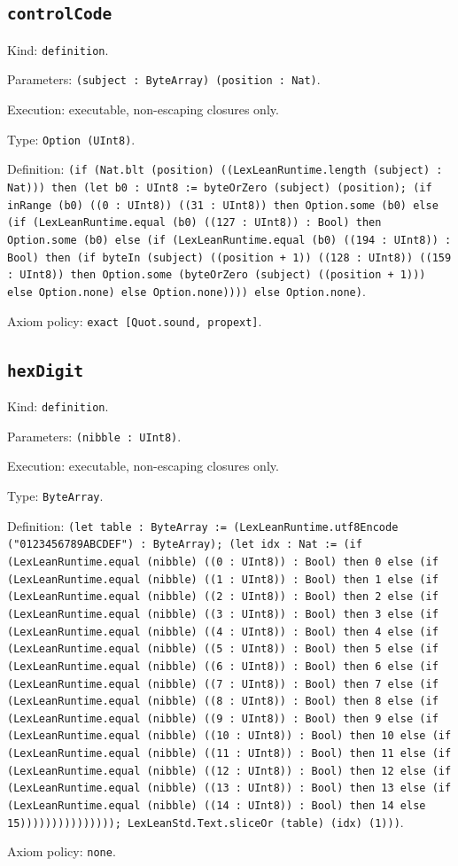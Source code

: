 \documentclass[11pt]{article}
\begin{document}
\subsection*{\texttt{controlCode}}
\noindent Kind: \texttt{definition}.\par
\noindent Parameters: \texttt{(subject : ByteArray) (position : Nat)}.\par
\noindent Execution: executable, non-escaping closures only.\par
\noindent Type: \texttt{Option (UInt8)}.\par
\noindent Definition: \texttt{(if (Nat.blt (position) ((LexLeanRuntime.length (subject) : Nat))) then (let b0 : UInt8 := byteOrZero (subject) (position); (if inRange (b0) ((0 : UInt8)) ((31 : UInt8)) then Option.some (b0) else (if (LexLeanRuntime.equal (b0) ((127 : UInt8)) : Bool) then Option.some (b0) else (if (LexLeanRuntime.equal (b0) ((194 : UInt8)) : Bool) then (if byteIn (subject) ((position + 1)) ((128 : UInt8)) ((159 : UInt8)) then Option.some (byteOrZero (subject) ((position + 1))) else Option.none) else Option.none)))) else Option.none)}.\par
\noindent Axiom policy: \texttt{exact [Quot.sound, propext]}.\par
\subsection*{\texttt{hexDigit}}
\noindent Kind: \texttt{definition}.\par
\noindent Parameters: \texttt{(nibble : UInt8)}.\par
\noindent Execution: executable, non-escaping closures only.\par
\noindent Type: \texttt{ByteArray}.\par
\noindent Definition: \texttt{(let table : ByteArray := (LexLeanRuntime.utf8Encode ("0123456789ABCDEF") : ByteArray); (let idx : Nat := (if (LexLeanRuntime.equal (nibble) ((0 : UInt8)) : Bool) then 0 else (if (LexLeanRuntime.equal (nibble) ((1 : UInt8)) : Bool) then 1 else (if (LexLeanRuntime.equal (nibble) ((2 : UInt8)) : Bool) then 2 else (if (LexLeanRuntime.equal (nibble) ((3 : UInt8)) : Bool) then 3 else (if (LexLeanRuntime.equal (nibble) ((4 : UInt8)) : Bool) then 4 else (if (LexLeanRuntime.equal (nibble) ((5 : UInt8)) : Bool) then 5 else (if (LexLeanRuntime.equal (nibble) ((6 : UInt8)) : Bool) then 6 else (if (LexLeanRuntime.equal (nibble) ((7 : UInt8)) : Bool) then 7 else (if (LexLeanRuntime.equal (nibble) ((8 : UInt8)) : Bool) then 8 else (if (LexLeanRuntime.equal (nibble) ((9 : UInt8)) : Bool) then 9 else (if (LexLeanRuntime.equal (nibble) ((10 : UInt8)) : Bool) then 10 else (if (LexLeanRuntime.equal (nibble) ((11 : UInt8)) : Bool) then 11 else (if (LexLeanRuntime.equal (nibble) ((12 : UInt8)) : Bool) then 12 else (if (LexLeanRuntime.equal (nibble) ((13 : UInt8)) : Bool) then 13 else (if (LexLeanRuntime.equal (nibble) ((14 : UInt8)) : Bool) then 14 else 15))))))))))))))); LexLeanStd.Text.sliceOr (table) (idx) (1)))}.\par
\noindent Axiom policy: \texttt{none}.\par
\end{document}
